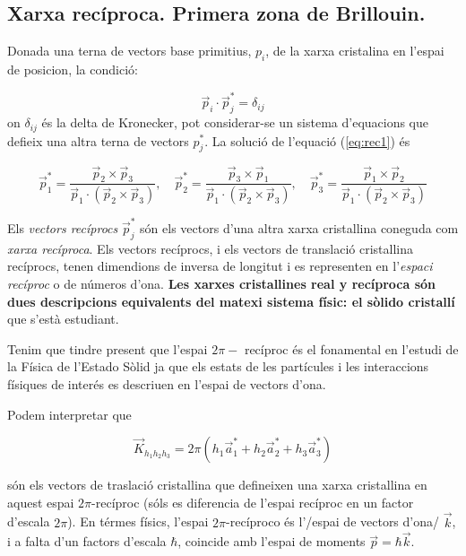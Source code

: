 \documentclass[12pt,twoside,a4paper]{article}%
\begin{document}
\subsection{Xarxa recíproca. Primera zona de Brillouin.}
Donada una terna de vectors base primitius, $p_i$, de la xarxa cristalina en l'espai de posicion, la condició:

\begin{equation}
\label{eq:rec1}
\vec p_i\cdot\vec p_j^{*}=\delta_{ij}
\end{equation}
on $\delta_{ij}$ és la delta de Kronecker, pot considerar-se un sistema d'equacions que defieix una altra terna de vectors $p_j^*$. La solució de l'equació (\ref{eq:rec1}) és

\begin{equation}
\label{eq:rec2}
\vec p_1^*=\frac{\vec p_2\times\vec p_3}{\vec p_1\cdot(\vec p_2\times\vec p_3)},\quad \vec p_2^*=\frac{\vec p_3\times\vec p_1}{\vec p_1\cdot(\vec p_2\times\vec p_3)}, \quad \vec p_3^*=\frac{\vec p_1\times\vec p_2}{\vec p_1\cdot(\vec p_2\times\vec p_3)}
\end{equation} 

Els \textit{vectors recíprocs} $\vec p_j^{*}$ són els vectors d'una altra xarxa cristallina coneguda com \textit{xarxa recíproca}. Els  vectors recíprocs, i els vectors de translació cristallina recíprocs, tenen dimendions de inversa de longitut i es representen en l'\textit{espaci recíproc} o de números d'ona. \textbf{Les xarxes cristallines real y recíproca són dues descripcions equivalents del matexi sistema físic: el sòlido cristallí} que s'està estudiant.


Tenim que tindre present que l'espai $2\pi-$ recíproc és el fonamental en l'estudi de la Física de l'Estado Sòlid ja que els estats de les partícules i les interaccions físiques de interés es descriuen en l'espai de vectors d'ona.

Podem interpretar que 

\begin{equation}
\label{eq:rec3}
\vec K_{h_1h_2h_3}=2\pi\left(h_1\vec a_1^{*}+h_2\vec a_2^{*}+h_3\vec a_3^{*}\right)
\end{equation}

són els vectors de traslació cristallina que defineixen una xarxa cristallina en aquest espai $2\pi$-recíproc (sóls es diferencia de l'espai recíproc en un factor d'escala $2\pi$). En térmes físics, l'espai $2\pi$-recíproco és l'/espai de vectors d'ona/ $\vec k$, i a falta d'un factors d'escala $\hbar$, coincide amb l'espai de moments  $\vec p=\hbar\vec k$. 
\end{document}
